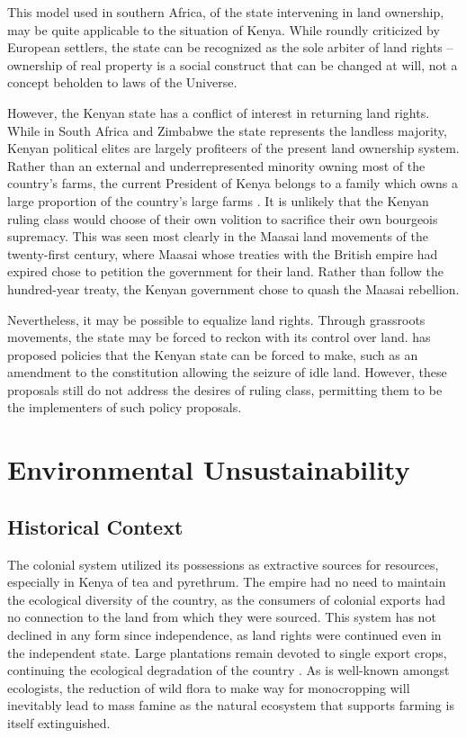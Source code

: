 \documentclass[american]{../../../coursework}
\begin{document}
This model used in southern Africa, of the state intervening in land
ownership, may be quite applicable to the situation of Kenya. While roundly
criticized by European settlers, the state can be recognized as the sole
arbiter of land rights -- ownership of real property is a social construct
that can be changed at will, not a concept beholden to laws of the Universe.

However, the Kenyan state has a conflict of interest in returning land rights.
While in South Africa and Zimbabwe the state represents the landless majority,
Kenyan political elites are largely profiteers of the present land ownership
system. Rather than an external and underrepresented minority owning most of
the country's farms, the current President of Kenya belongs to a family which
owns a large proportion of the country's large farms
\parencite{Berg-Schlosser1982}. It is unlikely that the Kenyan ruling class
would choose of their own volition to sacrifice their own bourgeois supremacy.
This was seen most clearly in the Maasai land movements of the twenty-first
century, where Maasai whose treaties with the British empire had expired chose
to petition the government for their land. Rather than follow the hundred-year
treaty, the Kenyan government chose to quash the Maasai rebellion.

Nevertheless, it may be possible to equalize land rights. Through grassroots
movements, the state may be forced to reckon with its control over land.
\textcite{Syagga2006} has proposed policies that the Kenyan state can be
forced to make, such as an amendment to the constitution allowing the seizure
of idle land. However, these proposals still do not address the desires of
ruling class, permitting them to be the implementers of such policy proposals.

\section{Environmental Unsustainability}
\subsection{Historical Context}

The colonial system utilized its possessions as extractive sources for
resources, especially in Kenya of tea and pyrethrum. The empire had no need to
maintain the ecological diversity of the country, as the consumers of colonial
exports had no connection to the land from which they were sourced. This
system has not declined in any form since independence, as land rights were
continued even in the independent state. Large plantations remain devoted to
single export crops, continuing the ecological degradation of the country
\parencite{Syagga2006}. As is well-known amongst ecologists, the reduction of
wild flora to make way for monocropping will inevitably lead to mass famine as
the natural ecosystem that supports farming is itself extinguished.
\end{document}
